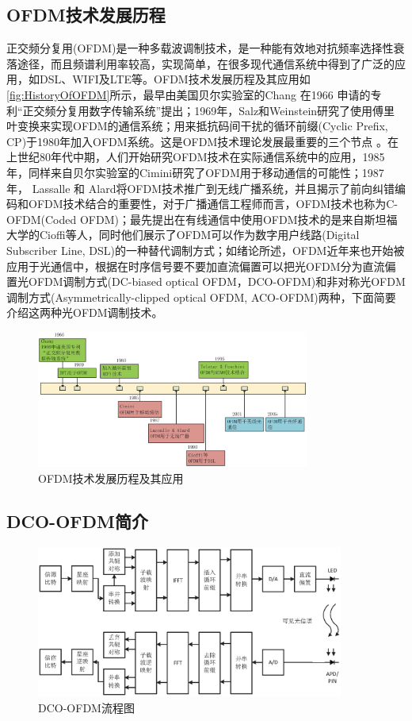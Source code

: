 \subsection{OFDM技术发展历程}
正交频分复用(OFDM)是一种多载波调制技术，是一种能有效地对抗频率选择性衰落途径，而且频谱利用率较高，实现简单，在很多现代通信系统中得到了广泛的应用，如DSL、WIFI及LTE等。OFDM技术发展历程及其应用如
\autoref{fig:HistoryOfOFDM}所示，最早由美国贝尔实验室的Chang 在1966 申请的专利“正交频分复用数字传输系统”提出；1969年，Salz和Weinstein研究了使用傅里叶变换来实现OFDM的通信系统；用来抵抗码间干扰的循环前缀(Cyclic Prefix, CP)于1980年加入OFDM系统。这是OFDM技术理论发展最重要的三个节点
\cite{armstrong2009ofdm}。在上世纪80年代中期，人们开始研究OFDM技术在实际通信系统中的应用，1985年，同样来自贝尔实验室的Cimini研究了OFDM用于移动通信的可能性；1987年， Lassalle 和 Alard将OFDM技术推广到无线广播系统，并且揭示了前向纠错编码和OFDM技术结合的重要性，对于广播通信工程师而言，OFDM技术也称为C-OFDM(Coded OFDM)；最先提出在有线通信中使用OFDM技术的是来自斯坦福大学的Cioffi等人，同时他们展示了OFDM可以作为数字用户线路(Digital Subscriber Line, DSL)的一种替代调制方式；如绪论所述，OFDM近年来也开始被应用于光通信中，根据在时序信号要不要加直流偏置可以把光OFDM分为直流偏置光OFDM调制方式(DC-biased optical OFDM，DCO-OFDM)和非对称光OFDM调制方式(Asymmetrically-clipped optical OFDM, ACO-OFDM)两种，下面简要介绍这两种光OFDM调制技术。
\begin{figure}[htbp]
    \centering
    \includegraphics[width=0.8\textwidth]{figures/Chapter-2/HistoryOfOFDM.eps}
    \caption{OFDM技术发展历程及其应用}
    \label{fig:HistoryOfOFDM}
\end{figure}
\subsection{DCO-OFDM简介}
\begin{figure}[htbp]
    \centering
    \includegraphics[width=0.9\textwidth]{figures/Chapter-2/DCO-OFDMStructure.eps}
    \caption{DCO-OFDM流程图}
    \label{fig:DCO-OFDMStructure}
\end{figure}

